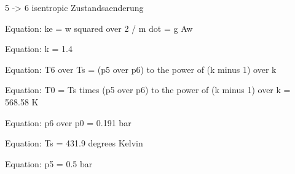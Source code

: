 5 -> 6 isentropic Zustandsaenderung

Equation: ke = w squared over 2 / m dot = g Aw

Equation: k = 1.4

Equation: T6 over Ts = (p5 over p6) to the power of (k minus 1) over k

Equation: T0 = Ts times (p5 over p6) to the power of (k minus 1) over k = 568.58 K

Equation: p6 over p0 = 0.191 bar

Equation: Ts = 431.9 degrees Kelvin

Equation: p5 = 0.5 bar